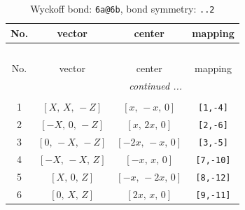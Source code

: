 \documentclass[fleqn,8pt]{jsarticle}
\begin{document}
\begin{longtable}{cccc}
\caption{Wyckoff bond: {\tt 6a@6b}, bond symmetry: {\tt ..2}}
 \\
 \hline \hline
No. & vector & center & mapping \\ \hline \endfirsthead

\multicolumn{3}{l}{\tablename\ \thetable{}} \\
 \hline \hline
No. & vector & center & mapping \\ \hline \endhead

 \hline \hline
\multicolumn{3}{r}{\footnotesize\it continued ...} \\ \endfoot

 \hline \hline
\multicolumn{3}{r}{} \\ \endlastfoot

1 & $\left[ X,\, X,\, - Z \right]$ & $\left[ x,\, - x,\, 0 \right]$ & {\tt [1,-4]} \\ \hline
2 & $\left[ - X,\, 0,\, - Z \right]$ & $\left[ x,\, 2 x,\, 0 \right]$ & {\tt [2,-6]} \\ \hline
3 & $\left[ 0,\, - X,\, - Z \right]$ & $\left[ - 2 x,\, - x,\, 0 \right]$ & {\tt [3,-5]} \\ \hline
4 & $\left[ - X,\, - X,\, Z \right]$ & $\left[ - x,\, x,\, 0 \right]$ & {\tt [7,-10]} \\ \hline
5 & $\left[ X,\, 0,\, Z \right]$ & $\left[ - x,\, - 2 x,\, 0 \right]$ & {\tt [8,-12]} \\ \hline
6 & $\left[ 0,\, X,\, Z \right]$ & $\left[ 2 x,\, x,\, 0 \right]$ & {\tt [9,-11]} \\
\end{longtable}
\renewcommand{\arraystretch}{1.2}
\end{document}

